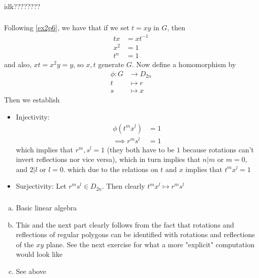 \documentclass{article}
\newcommand{\inv}[1]{ {#1}^{-1} }
\begin{document}
\subsubsection{}\label{ex6p23}
idk????????
\subsubsection{}\label{ex6p24}
Following \ref{ex2p6}, we have that if we set $t=xy$ in $G$, then
\begin{align*}
tx &= x\inv{t}\\
x^2 &= 1\\
t^n &= 1
\end{align*}
and also, $xt = x^2y =y$, so $x,t$ generate $G$. Now define a homomorphism by
\begin{align*}
\phi: G &\to D_{2n}\\
t &\mapsto r\\
s &\mapsto x
\end{align*}
Then we establish
\begin{itemize}
\item Injectivity:
\begin{align*}
\phi(t^mx^l) &= 1\\
\implies r^ms^l &= 1
\end{align*}
which implies that $r^m,s^l=1$ (they both have to be $1$ because rotations can't invert reflections nor vice versa), which in turn implies that $n|m$ or $m=0$, and $2|l$ or $l=0$. which due to the relations on $t$ and $x$ implies that $t^mx^l = 1$
\item Surjectivity:
Let $r^ms^l \in D_{2n}$. Then clearly $t^mx^l \mapsto r^ms^l$
\end{itemize}
\subsubsection{}\label{ex6p25}
\begin{enumerate}[(a)]
\item Basic linear algebra
\item This and the next part clearly follows from the fact that rotations and reflections of regular polygons can be identified with rotations and reflections of the $xy$ plane. See the next exercise for what a more "explicit" computation would look like
\item See above
\end{enumerate}
\end{document}
